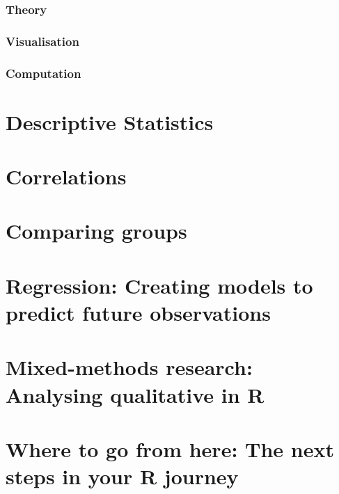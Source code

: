 \documentclass[
]{book}
\begin{document}
\hypertarget{theory}{%
\subsection{Theory}\label{theory}}

\hypertarget{visualisation}{%
\subsection{Visualisation}\label{visualisation}}

\hypertarget{computation}{%
\subsection{Computation}\label{computation}}

\hypertarget{descriptive-statistics}{%
\chapter{Descriptive Statistics}\label{descriptive-statistics}}

\hypertarget{correlations}{%
\chapter{Correlations}\label{correlations}}

\hypertarget{comparing-groups}{%
\chapter{Comparing groups}\label{comparing-groups}}

\hypertarget{regression-creating-models-to-predict-future-observations}{%
\chapter{Regression: Creating models to predict future observations}\label{regression-creating-models-to-predict-future-observations}}

\hypertarget{mixed-methods-research-analysing-qualitative-in-r}{%
\chapter{Mixed-methods research: Analysing qualitative in R}\label{mixed-methods-research-analysing-qualitative-in-r}}

\hypertarget{next-steps}{%
\chapter{Where to go from here: The next steps in your R journey}\label{next-steps}}
\end{document}
